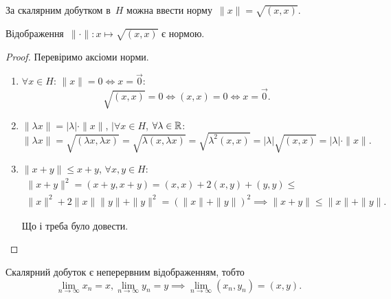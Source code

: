 За скалярним добутком в~$H$ можна ввести норму~$\|x\| = \sqrt{(x, x)}$.

\begin{lemma}
    Відображення~$\|\cdot\|: x \mapsto \sqrt{(x, x)}$ є нормою.
\end{lemma}

\begin{proof}
    Перевіримо аксіоми норми.
    \begin{enumerate}
        \item $\forall x \in H$: $\|x\| = 0 \iff x = \vec 0$:
        \begin{equation*}
            \sqrt{(x, x)} = 0 \iff (x, x) = 0 \iff x = \vec 0.
        \end{equation*}
        
        \item $\|\lambda x\| = |\lambda| \cdot \|x\|$, $|\forall x \in H$, $\forall \lambda \in \mathbb{R}$:
        \begin{equation*}
            \|\lambda x\| =
            \sqrt{(\lambda x, \lambda x)} =
            \sqrt{\lambda (x, \lambda x)} =
            \sqrt{\lambda^2 (x, x)} =
            |\lambda| \sqrt{(x, x)} =
            |\lambda| \cdot \|x\|.
        \end{equation*}
        
        \item $\|x + y\| \le x + y$, $\forall x, y \in H$:
        \begin{multline*}
            \|x + y\|^2 = (x + y, x + y) =
            (x, x) + 2 (x, y) + (y, y) \le \\
            \|x\|^2 + 2 \|x\| \|y\| + \|y\|^2 =
            (\|x\| + \|y\|)^2 \implies
            \|x + y\| \le \|x\| + \|y\|.
        \end{multline*}
        
        Що і треба було довести. \qedhere
    \end{enumerate}
\end{proof}

\begin{lemma}
    Скалярний добуток є неперервним відображенням, тобто
    \begin{equation*}
        \lim_{n \to \infty} x_n = x,
        \lim_{n \to \infty} y_n = y \implies
        \lim_{n \to \infty} (x_n, y_n) = (x, y).
    \end{equation*}
\end{lemma}

